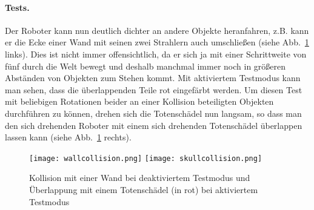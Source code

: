 \documentclass{../pi1-musterloesung}
\begin{document}
\paragraph{Tests.} Der Roboter kann nun deutlich dichter an andere Objekte heranfahren, z.B. kann er die Ecke einer Wand mit seinen zwei Strahlern auch umschließen (siehe Abb.~\ref{f:screenshots} links).  Dies ist nicht immer offensichtlich, da er sich ja mit einer Schrittweite von fünf durch die Welt bewegt und deshalb manchmal immer noch in größeren Abständen von Objekten zum Stehen kommt. Mit aktiviertem Testmodus kann man sehen, dass die überlappenden Teile rot eingefärbt werden. Um diesen Test mit beliebigen Rotationen beider an einer Kollision beteiligten Objekten durchführen zu können, drehen sich die Totenschädel nun langsam, so dass man den sich drehenden Roboter mit einem sich drehenden Totenschädel überlappen lassen kann (siehe Abb.~\ref{f:screenshots} rechts).

\begin{figure}[h]
\centering
\texttt{[image: wallcollision.png]}
\texttt{[image: skullcollision.png]}
\caption{Kollision mit einer Wand bei deaktiviertem Testmodus und Überlappung mit einem Totenschädel (in rot) bei aktiviertem Testmodus}
\label{f:screenshots}
\end{figure}
\end{document}
